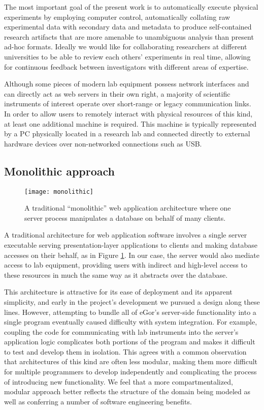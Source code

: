 \documentclass[../thesis]{subfiles}
\begin{document}
The most important goal of the present work is to automatically
execute physical experiments by employing computer control,
automatically collating raw experimental data with secondary data and
metadata to produce self-contained research artifacts that are more
amenable to unambiguous analysis than present ad-hoc formats.
Ideally we would like for collaborating researchers at different
universities to be able to review each others' experiments in real
time, allowing for continuous feedback between investigators with
different areas of expertise.

Although some pieces of modern lab equipment possess network interfaces
and can directly act as web servers in their own right, a majority of
scientific instruments of interest operate over short-range or legacy
communication links. In order to allow users to remotely interact with
physical resources of this kind, at least one additional machine is
required. This machine is typically represented by a PC physically
located in a research lab and connected directly to external hardware
devices over non-networked connections such as USB.

\subsection{Monolithic approach}
\begin{figure}
  \texttt{[image: monolithic]}
  \caption[Monolithic web architecture]{
    A traditional ``monolithic'' web application architecture where
    one server process manipulates a database on behalf of many clients.
    \label{fig:Monolithic}
  }
\end{figure}

A traditional architecture for web application software involves a
single server executable serving presentation-layer applications to
clients and making database accesses on their behalf, as in Figure
\ref{fig:Monolithic}. In our case, the server would also mediate
access to lab equipment, providing users with indirect and high-level
access to these resources in much the same way as it abstracts over
the database.

This architecture is attractive for its ease of deployment and its
apparent simplicity, and early in the project's development we pursued
a design along these lines. However, attempting to bundle all of
eGor's server-side functionality into a single program eventually
caused difficulty with system integration. For example, coupling the
code for communicating with lab instruments into the server's
application logic complicates both portions of the program and makes
it difficult to test and develop them in isolation. This agrees with a
common observation \cite{Stephens:2015:BSE:2826034} that architectures
of this kind are often less modular, making them more difficult for
multiple programmers to develop independently and complicating the
process of introducing new functionality. We feel that a more
compartmentalized, modular approach better reflects the structure of
the domain being modeled as well as conferring a number of software
engineering benefits.
\end{document}
